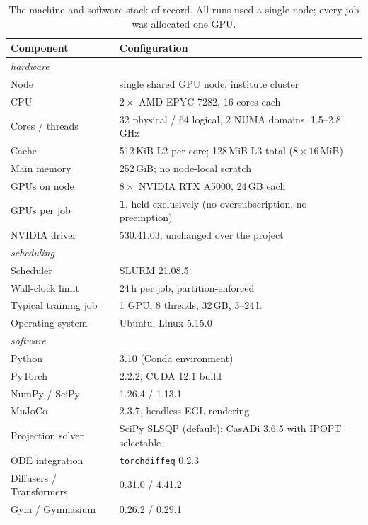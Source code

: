 \documentclass[headsepline,footsepline,footinclude=false,oneside,fontsize=11pt,paper=a4,listof=totoc,bibliography=totoc]{scrbook}
\theoremstyle{definition}
\theoremstyle{plain}
\theoremstyle{remark}
\begin{document}
\begin{table}[htpb]
  \caption[Compute environment]{The machine and software stack of record. All runs used a single
  node; every job was allocated one GPU.}
  \label{tab:compute}
  \centering
  \begin{tabular}{ll}
    \toprule
    Component & Configuration \\
    \midrule
    \multicolumn{2}{l}{\emph{hardware}}\\
    Node                    & single shared GPU node, institute cluster \\
    CPU                     & $2\times$ AMD EPYC 7282, 16 cores each \\
    Cores / threads         & 32 physical / 64 logical, 2 NUMA domains, 1.5--2.8\,GHz \\
    Cache                   & 512\,KiB L2 per core; 128\,MiB L3 total ($8\times16$\,MiB) \\
    Main memory             & 252\,GiB; no node-local scratch \\
    GPUs on node            & $8\times$ NVIDIA RTX A5000, 24\,GB each \\
    GPUs per job            & \textbf{1}, held exclusively (no oversubscription, no preemption) \\
    NVIDIA driver           & 530.41.03, unchanged over the project \\
    \midrule
    \multicolumn{2}{l}{\emph{scheduling}}\\
    Scheduler               & SLURM 21.08.5 \\
    Wall-clock limit        & 24\,h per job, partition-enforced \\
    Typical training job    & 1 GPU, 8 threads, 32\,GB, 3--24\,h \\
    Operating system        & Ubuntu, Linux 5.15.0 \\
    \midrule
    \multicolumn{2}{l}{\emph{software}}\\
    Python                  & 3.10 (Conda environment) \\
    PyTorch                 & 2.2.2, CUDA 12.1 build \\
    NumPy / SciPy           & 1.26.4 / 1.13.1 \\
    MuJoCo                  & 2.3.7, headless EGL rendering \\
    Projection solver       & SciPy SLSQP (default); CasADi 3.6.5 with IPOPT selectable \\
    ODE integration         & \texttt{torchdiffeq} 0.2.3 \\
    Diffusers / Transformers & 0.31.0 / 4.41.2 \\
    Gym / Gymnasium         & 0.26.2 / 0.29.1 \\
    \bottomrule
  \end{tabular}
\end{table}
\end{document}
